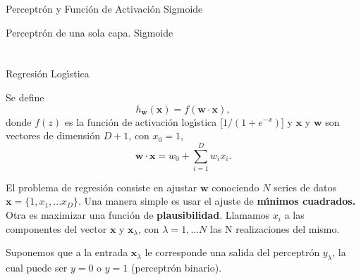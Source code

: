 \documentclass[10pd,hyperref={colorlinks=true}]{beamer}
\begin{document}

 \begin{frame}{Perceptr\'on y Funci\'on de 
 Activaci\'on Sigmoide}

 \vfill
 \centerline{}

 \centerline{Perceptr\'on de una sola capa. \hfill Sigmoide\hfill}
 \vfill

 \end{frame}


 \section{}
 \begin{frame}{Regresi\'on Log\'{\i}stica}

Se define
 $$
 h_{\bm{w}}(\bm{x}) = f(\bm{w}\cdot\bm{x}),
 $$
 donde $f(z)$ es la funci\'on de activaci\'on 
log\'{\i}stica [$1/(1+e^{-x})$] y $\bm{x}$ y $\bm{w}$ son 
vectores de dimensi\'on $D+1$, con $x_0=1$,
 $$
 \bm{w}\cdot\bm{x} = w_0 + \sum\limits_{i=1}^Dw_ix_i.
 $$

El problema de regresi\'on consiste en ajustar 
$\bm{w}$ conociendo $N$ series de datos $\bm{x} = 
\{1,x_1,...x_D\}$. Una manera simple es usar el ajuste 
de {\bf m\'{\i}nimos cuadrados.} Otra es maximizar una 
funci\'on de \textbf{plausibilidad}. Llamamos $x_i$ a 
las componentes del vector $\bm{x}$ y 
$\bm{x}_\lambda$, con $\lambda=1,...N$ las N 
realizaciones del mismo.

Suponemos que a la entrada $\bm{x}_\lambda$ le 
corresponde una salida del perceptr\'on $y_\lambda$, 
la cual puede ser $y=0$ o $y=1$ (perceptr\'on 
binario).

 \end{frame}

\end{document}
